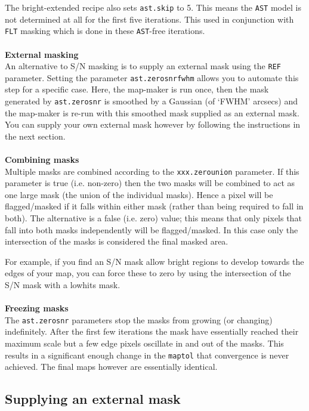 \documentclass[twoside,11pt]{article}
\newcommand{\xlabel}[1]{}
\renewcommand{\_}{\texttt{\symbol{95}}}
\begin{document}
The bright-extended recipe also sets \texttt{ast.skip} to 5. This
means the \texttt{AST} model is not determined at all for the first
five iterations. This used in conjunction with \texttt{FLT} masking
which is done in these \texttt{AST}-free iterations.
\\\\
\textbf{External masking}\\
An alternative to S/N masking is to supply an external mask using the
\texttt{REF} parameter. Setting the parameter
\texttt{ast.zero\_snr\_fwhm} allows you to automate this step for a
specific case. Here, the map-maker is run once, then the mask
generated by \texttt{ast.zero\_snr} is smoothed by a Gaussian (of
`FWHM' arcsecs) and the map-maker is re-run with this smoothed mask
supplied as an external mask. You can supply your own external mask
however by following the instructions in the next section.
\\\\
\textbf{Combining masks}\\
Multiple masks are combined according to the \texttt{xxx.zero\_union}
parameter. If this parameter is true (i.e. non-zero) then the two masks
will be combined to act as one large mask (the union of the individual
masks). Hence a pixel will be flagged/masked if it falls within either
mask (rather than being required to fall in both). The alternative is
a false (i.e. zero) value; this means that only pixels that fall into
both masks independently will be flagged/masked. In this case only the
intersection of the masks is considered the final masked area.

For example, if you find an S/N mask allow bright regions to develop
towards the edges of your map, you can force these to zero by using
the intersection of the S/N mask with a lowhits mask.
\\\\
\textbf{Freezing masks}\\
The \texttt{ast.zero\_snr} parameters stop the masks from growing
(or changing) indefinitely. After the first few iterations the mask
have essentially reached their maximum scale but a few edge pixels
oscillate in and out of the masks. This results in a significant enough
change in the \texttt{maptol} that convergence is never achieved. The
final maps however are essentially identical.


\subsection{\xlabel{maskbe}Supplying an external mask}
\label{sec:maskbe}
\end{document}
